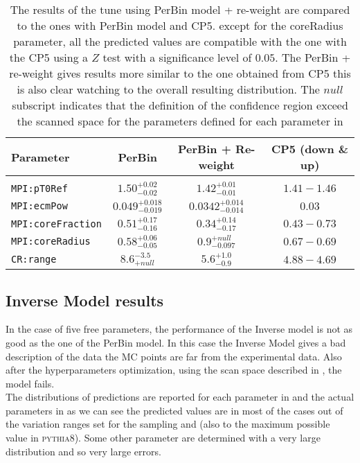 \begin{table}[!htb]
\centering
	\begin{tabular}{l | c | c | c }
		Parameter & PerBin & PerBin + Re-weight & CP5 (down \& up)\\ \hline\hline
		\\[-0.85em]		
\texttt{MPI:pT0Ref} & $ 1.50^{+0.02}_{-0.02}$ & $ 1.42_{-0.01}^{+0.01} $ & $1.41 - 1.46$\\[3pt]
\texttt{MPI:ecmPow} & $ 0.049_{-0.019}^{+0.018} $ & $ 0.0342_{-0.014}^{+0.014} $ & $0.03$\\[3pt]
\texttt{MPI:coreFraction} & $ 0.51_{-0.16}^{+0.17} $ & $ 0.34_{-0.17}^{+0.14} $ & $0.43 - 0.73$\\[3pt]
\texttt{MPI:coreRadius} & $ 0.58_{-0.05}^{+0.06} $ & $ 0.9_{-0.097}^{+null} $ & $0.67 - 0.69$\\[3pt]
\texttt{CR:range} & $ 8.6 ^{-3.5}_{+null} $ & $ 5.6_{-0.9}^{+1.0} $ & $4.88 - 4.69$\\[2pt]
\end{tabular}
\caption{The results of the tune using PerBin model + re-weight are compared to the ones with PerBin model and CP5. except for the coreRadius parameter, all the predicted values are compatible with the one with the CP5 using a $Z$ test with a significance level of $0.05$. The PerBin + re-weight gives results more similar to the one obtained from CP5 this is also clear watching to the overall resulting distribution. The $null$ subscript indicates that the definition of the confidence region exceed the scanned space for the parameters defined for each parameter in }
\label{table:result_PerBin_5params_rew}
\end{table}

\clearpage
\subsection{Inverse Model results}

In the case of five free parameters, the performance of the Inverse model is not as good as the one of the PerBin model.
In this case the Inverse Model gives a bad description of the data the MC points are far from the experimental data. Also after the hyperparameters optimization, using the scan space described in , the model fails.
\\
The distributions of predictions are reported for each parameter in  and the actual parameters in  as we can see the predicted values are in most of the cases out of the variation ranges set for the sampling and (also to the maximum possible value in \textsc{pythia8}). 
Some other parameter are determined with a very large distribution and so very large errors. 


